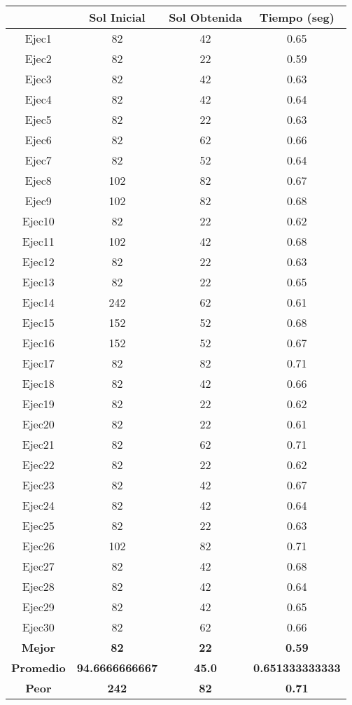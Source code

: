 \pagestyle{empty}


\begin{center}

\begin{table}
\begin{tabular}{|c|c|c|c|}

\hline
 & {\bf Sol Inicial} & {\bf Sol Obtenida} & {\bf Tiempo (seg)} \\
\hline
Ejec1 & 82 & 42  & 0.65 \\
\hline
Ejec2 & 82 & 22  & 0.59 \\
\hline
Ejec3 & 82 & 42  & 0.63 \\
\hline
Ejec4 & 82 & 42  & 0.64 \\
\hline
Ejec5 & 82 & 22  & 0.63 \\
\hline
Ejec6 & 82 & 62  & 0.66 \\
\hline
Ejec7 & 82 & 52  & 0.64 \\
\hline
Ejec8 & 102 & 82  & 0.67 \\
\hline
Ejec9 & 102 & 82  & 0.68 \\
\hline
Ejec10 & 82 & 22  & 0.62 \\
\hline
Ejec11 & 102 & 42  & 0.68 \\
\hline
Ejec12 & 82 & 22  & 0.63 \\
\hline
Ejec13 & 82 & 22  & 0.65 \\
\hline
Ejec14 & 242 & 62  & 0.61 \\
\hline
Ejec15 & 152 & 52  & 0.68 \\
\hline
Ejec16 & 152 & 52  & 0.67 \\
\hline
Ejec17 & 82 & 82  & 0.71 \\
\hline
Ejec18 & 82 & 42  & 0.66 \\
\hline
Ejec19 & 82 & 22  & 0.62 \\
\hline
Ejec20 & 82 & 22  & 0.61 \\
\hline
Ejec21 & 82 & 62  & 0.71 \\
\hline
Ejec22 & 82 & 22  & 0.62 \\
\hline
Ejec23 & 82 & 42  & 0.67 \\
\hline
Ejec24 & 82 & 42  & 0.64 \\
\hline
Ejec25 & 82 & 22  & 0.63 \\
\hline
Ejec26 & 102 & 82  & 0.71 \\
\hline
Ejec27 & 82 & 42  & 0.68 \\
\hline
Ejec28 & 82 & 42  & 0.64 \\
\hline
Ejec29 & 82 & 42  & 0.65 \\
\hline
Ejec30 & 82 & 62  & 0.66 \\
\hline
{\bf Mejor} & {\bf 82} & {\bf 22} & {\bf 0.59} \\
\hline
{\bf Promedio} & {\bf 94.6666666667} & {\bf 45.0} & {\bf 0.651333333333} \\
\hline
{\bf Peor} & {\bf 242} & {\bf 82} & {\bf 0.71} \\
\hline


\end{tabular}
\end{table}
\end{center}
